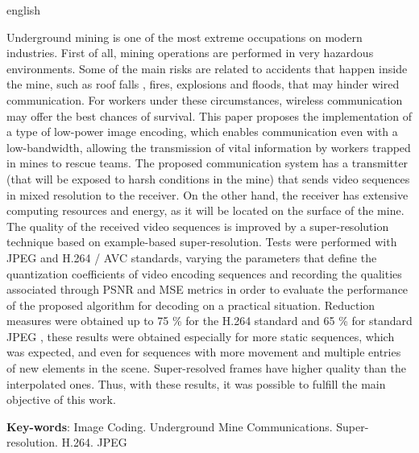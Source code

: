 \begin{resumo}[Abstract]
 \begin{otherlanguage*}{english}

Underground mining is one of the most extreme occupations on modern industries. First of all, mining operations are performed in very hazardous environments. Some of the main risks  are related to accidents that happen inside the mine, such as roof falls , fires, explosions and floods, that may hinder wired communication. For workers under these circumstances, wireless communication may offer the best chances of survival. This paper proposes the implementation of a type of low-power image encoding, which enables communication even with a  low-bandwidth, allowing the transmission of vital information by workers trapped in mines to rescue teams. The proposed communication system has a transmitter (that will be exposed to harsh conditions in the mine) that sends video sequences in mixed resolution to the receiver. On the other hand, the receiver has extensive computing resources and energy, as it will be located on the surface of the mine. The quality of the received video sequences is improved by a super-resolution technique based on example-based super-resolution. Tests were performed with JPEG and H.264 / AVC standards, varying the parameters that define the quantization coefficients of video encoding sequences and recording the qualities associated through PSNR and MSE metrics in order to evaluate the performance of the proposed algorithm for decoding on a practical situation. Reduction measures were obtained up to 75 \% for the H.264 standard and 65 \% for standard JPEG ,  these results were obtained especially for more static sequences, which was expected, and even for sequences with more movement and multiple entries of new elements in the scene. Super-resolved frames have higher quality than the interpolated ones. Thus, with these results, it was possible to fulfill the main objective of this work.
 
   \vspace{\onelineskip}
 
   \noindent 
   \textbf{Key-words}: Image Coding. Underground Mine Communications. Super-resolution. H.264. JPEG
    \end{otherlanguage*}
\end{resumo}
